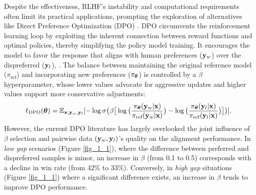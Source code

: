 Despite the effectiveness, RLHF's instability and computational requirements often limit its practical applications, prompting the exploration of alternatives like Direct Preference Optimization (DPO) \cite{DPO}. DPO circumvents the reinforcement learning loop by exploiting the inherent connection between reward functions and optimal policies, thereby simplifying the policy model training. It encourages the model to favor the response that aligns with human preferences ($\mathbf{y}_{w}$) over the dispreferred ($\mathbf{y}_{l}$), . 
The balance between maintaining the original reference model ($\pi_{\text{ref}}$) and incorporating new preferences ($\pi_{\bm{\theta}}$) is controlled by a $\beta$ hyperparameter, whose lower values advocate for aggressive updates and higher values support more conservative adjustments:
\begin{align*}
    \ell_{\text{DPO}}(\bm{\theta})=\mathbb{E}_{\mathbf{x},\mathbf{y}_{w},\mathbf{y}_{l}} [-\log \sigma \big(
    \beta \big[
    \log \big(\frac{\pi_{\bm{\theta}}(\mathbf{y}_{w}|\mathbf{x})}{\pi_{\text{ref}}(\mathbf{y}_{w}|\mathbf{x})}\big)
    -
    \log \big(\frac{\pi_{\bm{\theta}}(\mathbf{y}_{l}|\mathbf{x})}{\pi_{\text{ref}}(\mathbf{y}_{l}|\mathbf{x})}\big)
    \big]
    \big)].
\end{align*}
However, the current DPO literature has largely overlooked the joint influence of $\beta$ selection and pairwise data $(\mathbf{y}_{w}, \mathbf{y}_{l})$'s quality on the alignment performance.
In \emph{low gap} scenarios (\cf Figure \ref{fig_1_1}),
where the difference between preferred and dispreferred samples is minor, an increase in $\beta$ (\eg from 0.1 to 0.5) corresponds with a decline in win rate (\eg from 42\% to 33\%).
Conversely, in \emph{high gap} situations (\cf Figure \ref{fig_1_1})
where a significant difference exists, an increase in $\beta$ tends to improve DPO performance.
